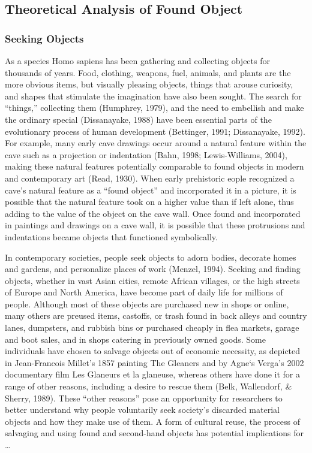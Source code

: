\documentclass[12pt]{article}
\begin{document}
\subsection{Theoretical Analysis of Found Object}
\subsubsection{Seeking Objects}
As a species Homo sapiens has been gathering and collecting objects for thousands of years. Food, clothing, weapons, fuel, animals, and plants are the more obvious items, but visually pleasing objects, things that arouse curiosity, and shapes that stimulate the imagination have also been sought. The search for “things,” collecting them (Humphrey, 1979), and the need to embellish and make the ordinary special (Dissanayake, 1988) have been essential parts of the evolutionary process of human development (Bettinger, 1991; Dissanayake, 1992). For example, many early cave drawings occur around a natural feature within the cave such as a projection or indentation (Bahn, 1998; Lewis-Williams, 2004), making these natural features potentially comparable to found objects in modern and contemporary art (Read, 1930). When early prehistoric eople recognized a cave’s natural feature as a “found object” and incorporated it in a picture, it is possible that the natural feature took on a higher value than if left alone, thus adding to the value of the object on the cave wall. Once found and incorporated in paintings and drawings on a cave wall, it is possible that these protrusions and indentations became objects that functioned symbolically.

In contemporary societies, people seek objects to adorn bodies, decorate homes and gardens, and personalize places of work (Menzel, 1994). Seeking and finding objects, whether in vast Asian cities, remote African villages, or the high streets of Europe and North America, have become part of daily life for millions of people. Although most of these objects are purchased new in shops or online, many others are preused items, castoffs, or trash found in back alleys and country lanes, dumpsters, and rubbish bins or purchased cheaply in flea markets, garage and boot sales, and in shops catering in previously owned goods. Some individuals have chosen to salvage objects out of economic necessity, as depicted in Jean-Francois Millet’s 1857 painting The Gleaners and by Agne`s Verga’s 2002 documentary film Les Glaneurs et la glaneuse, whereas others have done it for a range of other reasons, including a desire to rescue them (Belk, Wallendorf, \& Sherry, 1989). These “other reasons” pose an opportunity for researchers to better understand why people voluntarily seek society’s discarded material objects and how they make use of them. A form of cultural reuse, the process
of salvaging and using found and second-hand objects has potential implications for \ldots 
\end{document}
